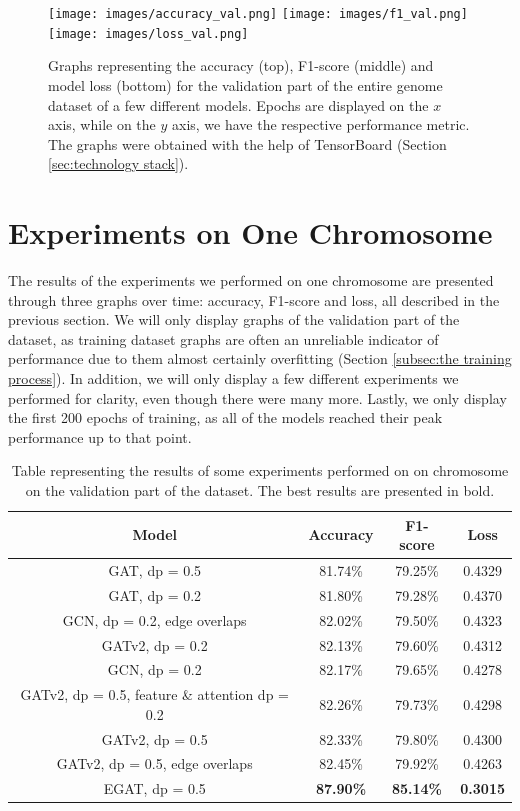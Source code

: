 \documentclass[times, utf8, diplomski, english]{fer_eng}
\begin{document}
\begin{figure}[h]
	\centering
	\texttt{[image: images/accuracy\_val.png]}
	\texttt{[image: images/f1\_val.png]}
	\texttt{[image: images/loss\_val.png]}
	\caption[Accuracy, f1-score and loss graph for one chromosome]{Graphs representing the accuracy (top), F1-score (middle) and model loss (bottom) for the validation part of the entire genome dataset of a few different models. Epochs are displayed on the $x$ axis, while on the $y$ axis, we have the respective performance metric. The graphs were obtained with the help of TensorBoard (Section \ref{sec:technology stack}).}
	\label{fig:accuracy and f1 graph}
\end{figure}

\section{Experiments on One Chromosome}
\label{sec:experiments on one chromosome}

The results of the experiments we performed on one chromosome are presented through three graphs over time: accuracy, F1-score and loss, all described in the previous section. We will only display graphs of the validation part of the dataset, as training dataset graphs are often an unreliable indicator of performance due to them almost certainly overfitting (Section \ref{subsec:the training process}). In addition, we will only display a few different experiments we performed for clarity, even though there were many more. Lastly, we only display the first 200 epochs of training, as all of the models reached their peak performance up to that point.

\begin{table}
	\centering
	\begin{tabular}{ |c|c|c|c| }
		\hline	
		Model & Accuracy & F1-score & Loss \\
		\hline\hline
		GAT, dp = 0.5 & 81.74\% & 79.25\% & 0.4329 \\
		\hline
		GAT, dp = 0.2 & 81.80\% & 79.28\% & 0.4370 \\
		\hline
		GCN, dp = 0.2, edge overlaps & 82.02\% & 79.50\% & 0.4323 \\
		\hline
		GATv2, dp = 0.2 & 82.13\% & 79.60\% & 0.4312 \\
		\hline
		GCN, dp = 0.2 & 82.17\% & 79.65\% & 0.4278 \\
		\hline
		GATv2, dp = 0.5, feature \& attention dp = 0.2 & 82.26\% & 79.73\% & 0.4298 \\
		\hline
		GATv2, dp = 0.5 & 82.33\% & 79.80\% & 0.4300 \\
		\hline
		GATv2, dp = 0.5, edge overlaps & 82.45\% & 79.92\% & 0.4263 \\
		\hline
		EGAT, dp = 0.5 & \textbf{87.90\%} & \textbf{85.14\%} & \textbf{0.3015} \\
		\hline
	\end{tabular}
	\caption{Table representing the results of some experiments performed on on chromosome on the validation part of the dataset. The best results are presented in bold.}
	\label{tab:results}
\end{table}	
\end{document}
